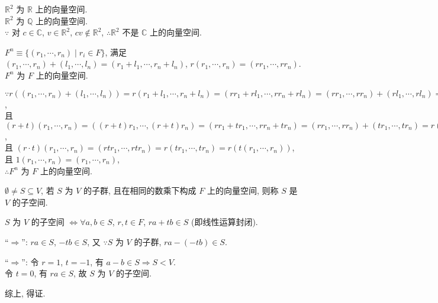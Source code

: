 \documentclass{note}
\begin{document}
\begin{eg}
    $\mathbb{R}^2$ 为 $\mathbb{R}$ 上的向量空间.\\
    $\mathbb{R}^2$ 为 $\mathbb{Q}$ 上的向量空间.\\
    $\because$ 对 $c\in\mathbb{C}$, $v\in\mathbb{R}^2$, $cv\notin\mathbb{R}^2$, $\therefore\mathbb{R}^2$ 不是 $\mathbb{C}$ 上的向量空间.
\end{eg}

\begin{eg}
    $F^n\equiv\{(r_1,\cdots,r_n)\mid r_i\in F\}$, 满足 $(r_1,\cdots,r_n)+(l_1,\cdots,l_n)=(r_1+l_1,\cdots,r_n+l_n)$, $r(r_1,\cdots,r_n)=(rr_1,\cdots,rr_n)$. $F^n$ 为 $F$ 上的向量空间.
\end{eg}
\begin{pf}
    $\because r((r_1,\cdots,r_n)+(l_1,\cdots,l_n))=r(r_1+l_1,\cdots,r_n+l_n)=(rr_1+rl_1,\cdots,rr_n+rl_n)=(rr_1,\cdots,rr_n)+(rl_1,\cdots,rl_n)=r(r_1,\cdots,r_n)+r(l_1,\cdots,l_n)$,\\
    且 $(r+t)(r_1,\cdots,r_n)=((r+t)r_1,\cdots,(r+t)r_n)=(rr_1+tr_1,\cdots,rr_n+tr_n)=(rr_1,\cdots,rr_n)+(tr_1,\cdots,tr_n)=r(r_1,\cdots,r_n)+t(r_1,\cdots,r_n)$,\\
    且 $(r\cdot t)(r_1,\cdots,r_n)=(rtr_1,\cdots,rtr_n)=r(tr_1,\cdots,tr_n)=r(t(r_1,\cdots,r_n))$,\\
    且 $1(r_1,\cdots,r_n)=(r_1,\cdots,r_n)$,\\
    $\therefore F^n$ 为 $F$ 上的向量空间.
\end{pf}

\begin{df}[子空间]
    $\emptyset\neq S\subseteq V$, 若 $S$ 为 $V$ 的子群, 且在相同的数乘下构成 $F$ 上的向量空间, 则称 $S$ 是 $V$ 的子空间.
\end{df}

\begin{thm}
    $S$ 为 $V$ 的子空间 $\Longleftrightarrow\forall a,b\in S$, $r,t\in F$, $ra+tb\in S$ (即线性运算封闭).
\end{thm}
\begin{pf}
    ``$\Longrightarrow$'': $ra\in S$, $-tb\in S$, 又 $\because S$ 为 $V$ 的子群, $ra-(-tb)\in S$.

    ``$\Longrightarrow$'': 令 $r=1$, $t=-1$, 有 $a-b\in S\Longrightarrow S<V$.\\
    令 $t=0$, 有 $ra\in S$, 故 $S$ 为 $V$ 的子空间.

    综上, 得证.
\end{pf}
\end{document}
